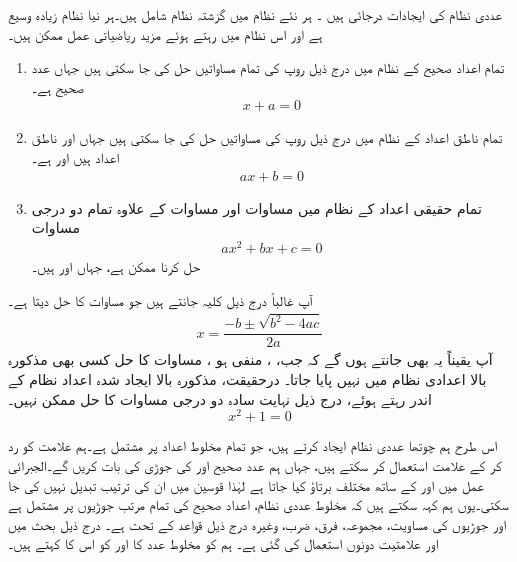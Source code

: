عددی نظام  کی ایجادات  درجائی ہیں ۔ ہر نئے   نظام  میں گزشتہ نظام  شامل ہیں۔ہر نیا نظام زیادہ وسیع ہے اور اس نظام  میں  رہتے ہوئے  مزید  ریاضیاتی عمل ممکن ہیں۔

\begin{enumerate}[1.]
\item
تمام  اعداد صحیح  کے نظام میں درج ذیل روپ کی تمام مساواتیں حل کی جا سکتی ہیں جہاں  عدد صحیح ہے۔
\begin{align}\label{مساوات_ضمیمہ_مخلوط_چھ}
x+a=0
\end{align}
\item
تمام ناطق اعداد کے نظام میں درج ذیل روپ کی مساواتیں حل کی جا سکتی ہیں جہاں  اور  ناطق اعداد ہیں اور  ہے۔
\begin{align}\label{مساوات_ضمیمہ_مخلوط_سات}
ax+b=0
\end{align}
\item
تمام حقیقی اعداد کے نظام میں مساوات  اور مساوات  کے علاوہ  تمام دو درجی مساوات
\begin{align}\label{مساوات_ضمیمہ_مخلوط_آٹھ}
ax^2+bx+c=0
\end{align}
حل کرنا ممکن ہے، جہاں   اور  ہیں۔ 
\end{enumerate}

آپ غالباً درج ذیل کلیہ جانتے ہیں جو مساوات  کا حل دیتا ہے۔
\begin{align}\label{مساوات_ضمیمہ_مخلوط_نو}
x=\dfrac{-b\pm\sqrt{b^2-4ac}}{2a}
\end{align}
آپ یقیناً یہ بھی جانتے ہوں گے کہ  جب، ،  منفی ہو ، مساوات  کا حل  کسی بھی  مذکورہ بالا اعدادی نظام میں نہیں پایا جاتا۔ درحقیقت، مذکورہ بالا ایجاد شدہ اعداد نظام کے اندر رہتے ہوئے،  درج ذیل نہایت سادہ دو درجی  مساوات کا حل ممکن نہیں۔
\[x^2+1=0\]

اس طرح ہم چوتھا  عددی نظام ایجاد کرتے ہیں، جو  تمام مخلوط اعداد  پر مشتمل ہے۔ہم علامت  کو رد کر کے علامت  استعمال کر سکتے ہیں، جہاں  ہم عدد صحیح   اور   کی جوڑی کی بات کریں گے۔الجبرائی عمل میں  اور    کے ساتھ مختلف  برتاؤ کیا جاتا ہے لہٰذا  قوسین میں ان کی ترتیب  تبدیل نہیں  کی جا سکتی۔یوں ہم کہہ سکتے ہیں کہ مخلوط عددی نظام، اعداد صحیح کی  تمام مرتب جوڑیوں  پر مشتمل ہے  اور  جوڑیوں کی مساویت، مجموعہ، فرق، ضرب، وغیرہ درج ذیل قواعد کے تحت   ہے۔  درج ذیل بحث میں   اور  علامتیت دونوں استعمال کی گئی ہے۔ ہم  کو مخلوط عدد  کا  اور  کو اس کا کہتے ہیں۔

